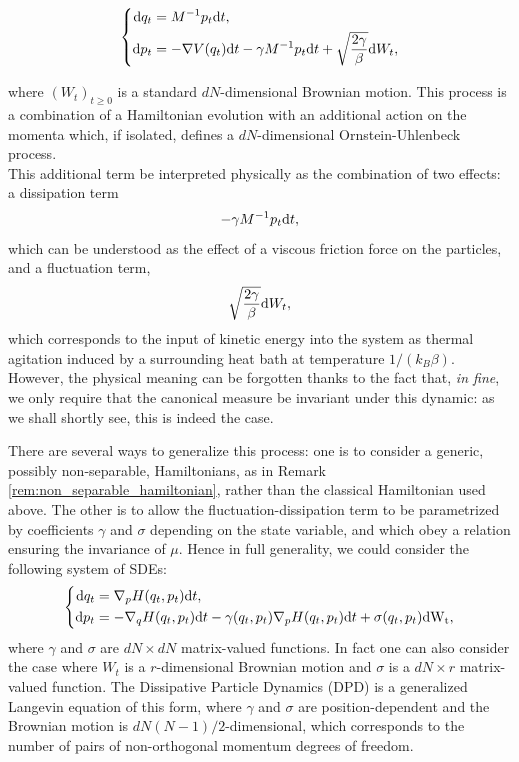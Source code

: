 \begin{equation}
    \label{eq:langevin}
    \left\{\begin{aligned}
        \text dq_t&=M^{-1}p_t\mathrm{d}t,\\
        \text dp_t&= -\nabla V(q_t)\mathrm{d}t -\gamma M^{-1}p_t\mathrm{d}t+\sqrt{\frac{2\gamma}\beta}\text dW_t,
    \end{aligned}\right.
\end{equation}

where $(W_t)_{t\geq 0}$ is a standard $dN$-dimensional Brownian motion.
This process is a combination of a Hamiltonian evolution with an additional action on the momenta which, if isolated, defines a $dN$-dimensional Ornstein-Uhlenbeck process.\\
This additional term be interpreted physically as the combination of two effects: a dissipation term 
$$-\gamma M^{-1}p_t\mathrm{d}t,$$
which can be understood as the effect of a viscous friction force on the particles, and a fluctuation term, 
$$\sqrt{\frac{2\gamma}\beta}\text dW_t,$$
which corresponds to the input of kinetic energy into the system as thermal agitation induced by a surrounding heat bath at temperature $1/(k_B\beta)$.\\
However, the physical meaning can be forgotten thanks to the fact that, \textit{in fine}, we only require that the canonical measure be invariant under this dynamic: as we shall shortly see, this is indeed the case.

\begin{remark}
    There are several ways to generalize this process: one is to consider a generic, possibly non-separable, Hamiltonians, as in Remark \ref{rem:non_separable_hamiltonian}, rather than the classical Hamiltonian used above.
    The other is to allow the fluctuation-dissipation term to be parametrized by coefficients $\gamma$ and $\sigma$ depending on the state variable, and which obey a relation ensuring the invariance of $\mu$.
    Hence in full generality, we could consider the following system of SDEs:
    \begin{equation}
        \label{eq:general_langevin}
        \left\{\begin{aligned}
            \text dq_t &=\nabla_p H(q_t,p_t)\mathrm{d}t,\\
            \text dp_t &= -\nabla_q H(q_t,p_t)\mathrm{d}t -\gamma(q_t,p_t)\nabla_pH(q_t,p_t)\mathrm{d}t+\sigma(q_t,p_t)\rm{d}W_t,
        \end{aligned}\right.
    \end{equation}
    where $\gamma$ and $\sigma$ are $dN \times dN$ matrix-valued functions.
    In fact one can also consider the case where $W_t$ is a $r$-dimensional Brownian motion and $\sigma$ is a $dN\times r$ matrix-valued function.
    The Dissipative Particle Dynamics (DPD) is a generalized Langevin equation of this form, where $\gamma$ and $\sigma$ are position-dependent and the Brownian motion is $dN(N-1)/2$-dimensional, which corresponds to the number of pairs of non-orthogonal momentum degrees of freedom.
\end{remark}

